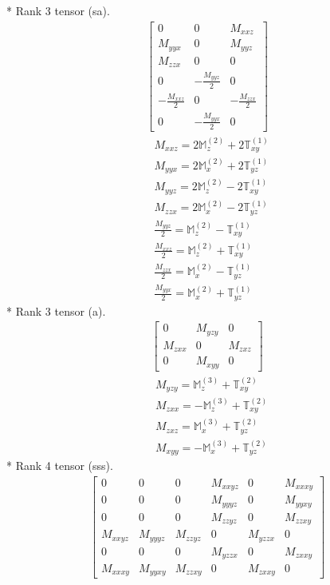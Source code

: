 \documentclass[fleqn,8pt,landscape]{jsarticle}
\begin{document}
* Rank 3 tensor (sa).
\begin{align*}
\begin{bmatrix} 0 & 0 & M_{xxz} \\ M_{yyx} & 0 & M_{yyz} \\ M_{zzx} & 0 & 0 \\ 0 & - \frac{M_{yyz}}{2} & 0 \\ - \frac{M_{xxz}}{2} & 0 & - \frac{M_{zzx}}{2} \\ 0 & - \frac{M_{yyx}}{2} & 0 \end{bmatrix}
\end{align*}
\begin{align*}
& M_{xxz} = 2 \mathbb{M}_{z}^{(2)} + 2 \mathbb{T}_{xy}^{(1)} \\
& M_{yyx} = 2 \mathbb{M}_{x}^{(2)} + 2 \mathbb{T}_{yz}^{(1)} \\
& M_{yyz} = 2 \mathbb{M}_{z}^{(2)} - 2 \mathbb{T}_{xy}^{(1)} \\
& M_{zzx} = 2 \mathbb{M}_{x}^{(2)} - 2 \mathbb{T}_{yz}^{(1)} \\
& \frac{M_{yyz}}{2} = \mathbb{M}_{z}^{(2)} - \mathbb{T}_{xy}^{(1)} \\
& \frac{M_{xxz}}{2} = \mathbb{M}_{z}^{(2)} + \mathbb{T}_{xy}^{(1)} \\
& \frac{M_{zzx}}{2} = \mathbb{M}_{x}^{(2)} - \mathbb{T}_{yz}^{(1)} \\
& \frac{M_{yyx}}{2} = \mathbb{M}_{x}^{(2)} + \mathbb{T}_{yz}^{(1)}
\end{align*}
* Rank 3 tensor (a).
\begin{align*}
\begin{bmatrix} 0 & M_{yzy} & 0 \\ M_{zxx} & 0 & M_{zxz} \\ 0 & M_{xyy} & 0 \end{bmatrix}
\end{align*}
\begin{align*}
& M_{yzy} = \mathbb{M}_{z}^{(3)} + \mathbb{T}_{xy}^{(2)} \\
& M_{zxx} = - \mathbb{M}_{z}^{(3)} + \mathbb{T}_{xy}^{(2)} \\
& M_{zxz} = \mathbb{M}_{x}^{(3)} + \mathbb{T}_{yz}^{(2)} \\
& M_{xyy} = - \mathbb{M}_{x}^{(3)} + \mathbb{T}_{yz}^{(2)}
\end{align*}
* Rank 4 tensor (sss).
\begin{align*}
\begin{bmatrix} 0 & 0 & 0 & M_{xxyz} & 0 & M_{xxxy} \\ 0 & 0 & 0 & M_{yyyz} & 0 & M_{yyxy} \\ 0 & 0 & 0 & M_{zzyz} & 0 & M_{zzxy} \\ M_{xxyz} & M_{yyyz} & M_{zzyz} & 0 & M_{yzzx} & 0 \\ 0 & 0 & 0 & M_{yzzx} & 0 & M_{zxxy} \\ M_{xxxy} & M_{yyxy} & M_{zzxy} & 0 & M_{zxxy} & 0 \end{bmatrix}
\end{align*}
\end{document}
